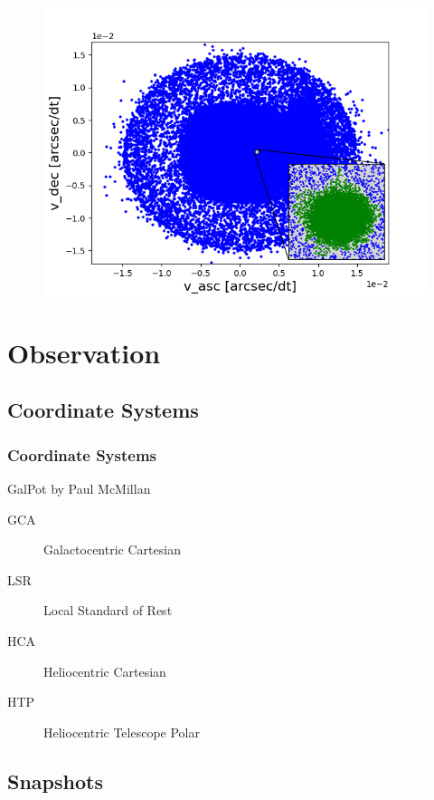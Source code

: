 \documentclass{beamer}
\begin{document}
\begin{frame}
\begin{figure}
\centering
\includegraphics[width=\textwidth,height=0.8\textheight,keepaspectratio]{Images/title_page.png}
\end{figure}
\end{frame}

\section{Observation}

\subsection{Coordinate Systems}

\begin{frame}
\frametitle{Coordinate Systems}

GalPot by Paul McMillan
\\[2ex]
\begin{description}
\item[GCA] Galactocentric Cartesian
\item[LSR] Local Standard of Rest
\item[HCA] Heliocentric Cartesian
\item[HTP] Heliocentric Telescope Polar
\end{description}

\end{frame}

\subsection{Snapshots}
\end{document}
